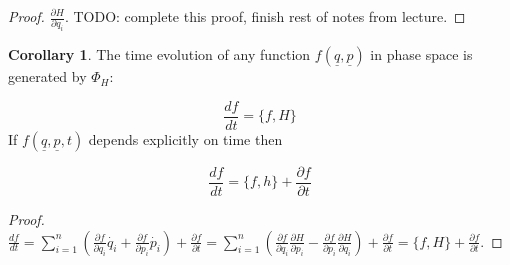 \documentclass[12pt,a4paper]{article}
\theoremstyle{definition}
\newtheorem{corollary}[definition]{Corollary}
\begin{document}
\begin{proof}
	$\frac{\partial H}{\partial q_i}$. TODO: complete this proof, finish rest of notes from lecture.
\end{proof}

\begin{corollary}
	The time evolution of any function $f(\underline{q}, \underline{p})$ in phase space is generated by $\Phi_H$:

	\[ \frac{df}{dt} = \{ f, H \} \]
	If $f(\underline{q}, \underline{p}, t)$ depends explicitly on time then

	\[ \frac{df}{dt} = \{ f, h \} + \frac{\partial f}{\partial t} \]
\end{corollary}

\begin{proof}
	$\frac{df}{dt} = \sum_{i = 1}^n \left( \frac{\partial f}{\partial q_i} \dot{q_i} + \frac{\partial f}{\partial p_i} \dot{p_i} \right) + \frac{\partial f}{\partial t} = \sum_{i = 1}^n \left( \frac{\partial f}{\partial q_i} \frac{\partial H}{\partial p_i} - \frac{\partial f}{\partial p_i} \frac{\partial H}{\partial q_i} \right) + \frac{\partial f}{\partial t} = \{ f, H \} + \frac{\partial f}{\partial t}$.
\end{proof}
\end{document}
